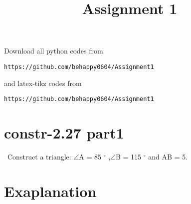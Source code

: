 \documentclass[journal,12pt,twocolumn]{IEEEtran}
\begin{document}
     \def\rightbox#1{\makebox[0in][r]{#1}}
     \def\centbox#1{\makebox[0in]{#1}}
     \def\topbox#1{\raisebox{-\baselineskip}[0in][0in]{#1}}
     \def\midbox#1{\raisebox{-0.5\baselineskip}[0in][0in]{#1}}
\vspace{3cm}
\title{Assignment 1}
\maketitle
\newpage
\bigskip
\renewcommand{\thefigure}{\theenumi}
\renewcommand{\thetable}{\theenumi}
Download all python codes from 
\begin{lstlisting}
https://github.com/behappy0604/Assignment1
\end{lstlisting}
%
and latex-tikz codes from 
%
\begin{lstlisting}
https://github.com/behappy0604/Assignment1
\end{lstlisting}
%
\section{constr-2.27 part1}
\ Construct a triangle: $\angle$A = 85 $^{\circ}$ ,$\angle$B = 115 $^{\circ}$ and AB = 5.

\section{Exaplanation}
%
\end{document}
